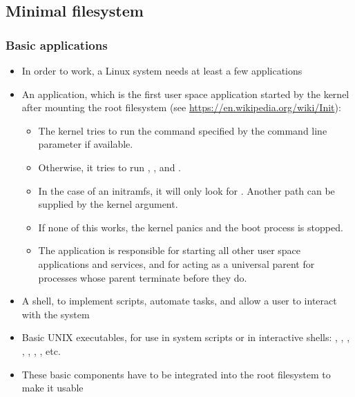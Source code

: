 \subsection{Minimal filesystem}
\begin{frame}
  \frametitle{Basic applications}
  \fontsize{10}{10}\selectfont
  \begin{itemize}
  \item In order to work, a Linux system needs at least a few
    applications
  \item An  application, which is the first user space
    application started by the kernel after mounting the root
    filesystem (see \url{https://en.wikipedia.org/wiki/Init}):
    \begin{itemize}
    \item The kernel tries to run the command specified by the
           command line parameter if available.
    \item Otherwise, it tries to run , ,
       and .
    \item In the case of an initramfs, it will only look for
      . Another path can be supplied by the 
      kernel argument.
    \item If none of this works, the kernel panics and the boot
      process is stopped.
    \item The  application is responsible for starting all other
      user space applications and services, and for acting as a
      universal parent for processes whose parent terminate before they do.
    \end{itemize}
  \item A shell, to implement scripts, automate tasks, and allow a user
        to interact with the system
  \item Basic UNIX executables, for use in system scripts or in
        interactive shells: , , , ,
        , , , etc.
  \item These basic components have to be integrated into the root
    filesystem to make it usable
  \end{itemize}
\end{frame}
